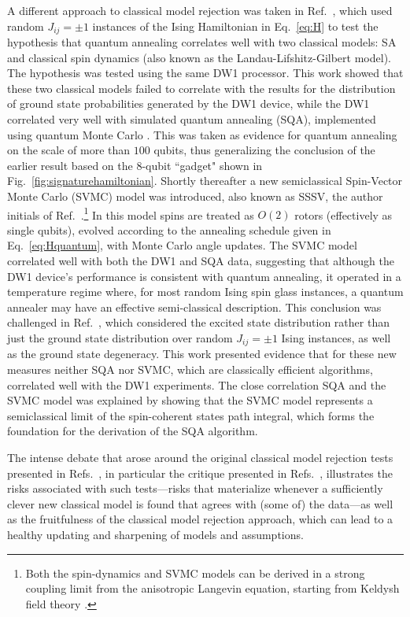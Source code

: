 A different approach to classical model rejection was taken in Ref.~\cite{q108}, which used random $J_{ij}=\pm 1$ instances of the Ising Hamiltonian in Eq.~\eqref{eq:H} to test the hypothesis that quantum annealing correlates well with two classical models: SA and classical spin dynamics \cite{Smolin} (also known as the Landau-Lifshitz-Gilbert model). The hypothesis was tested using the same DW1 processor. This work showed that these two classical models failed to correlate with the results for the distribution of ground state probabilities generated by the DW1 device, while the DW1 correlated very well with simulated quantum annealing (SQA), implemented using quantum Monte Carlo \cite{sqa1}. This was taken as evidence for quantum annealing on the scale of more than $100$ qubits, thus generalizing the conclusion of the earlier result \cite{q-sig} based on the $8$-qubit ``gadget" shown in Fig.~\ref{fig:signaturehamiltonian}. Shortly thereafter a new semiclassical Spin-Vector Monte Carlo (SVMC) model was introduced, also known as SSSV, the author initials of Ref.~\cite{SSSV}.\footnote{Both the spin-dynamics and SVMC models can be derived in a strong coupling limit from the anisotropic Langevin equation, starting from Keldysh field theory \cite{Crowley:2016aa}.}
In this model spins are treated as $O(2)$ rotors (effectively as single qubits), evolved according to the annealing schedule given in Eq.~\eqref{eq:Hquantum}, with Monte Carlo angle updates. The SVMC model correlated well with both the DW1 and SQA data, suggesting that although the DW1 device's performance is consistent with quantum annealing, it operated in a temperature regime where, for most random Ising spin glass instances, a quantum annealer may have an effective semi-classical description. This conclusion was challenged in Ref.~\cite{Albash:2014if}, which considered the excited state distribution rather than just the ground state distribution over random $J_{ij}=\pm 1$ Ising instances, as well as the ground state degeneracy. This work presented evidence that for these new measures neither SQA nor SVMC, which are classically efficient algorithms, correlated well with the DW1 experiments. The close correlation SQA and the SVMC model was explained by showing that the SVMC model represents a semiclassical limit of the spin-coherent states path integral, which forms the foundation for the derivation of the SQA algorithm.

The intense debate that arose around the original classical model rejection tests presented in Refs.~\cite{q-sig,q108}, in particular the critique presented in Refs.~\cite{Smolin,SSSV}, illustrates the risks associated with such tests---risks that materialize whenever a sufficiently clever new classical model is found that agrees with (some of) the data---as well as the fruitfulness of the classical model rejection approach, which can lead to a healthy updating and sharpening of models and assumptions.

